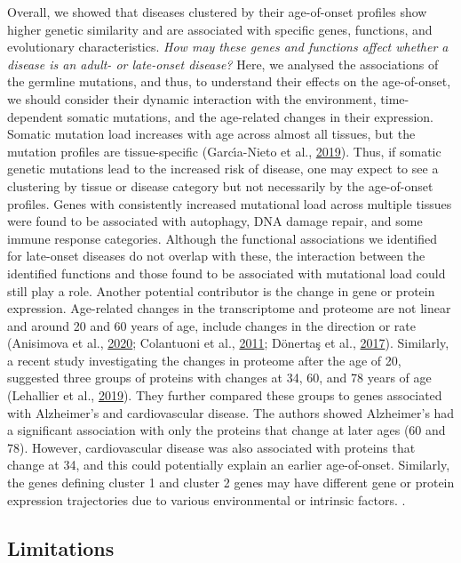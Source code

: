 \documentclass[12pt,twoside]{unicam}
\begin{document}
Overall, we showed that diseases clustered by their age-of-onset profiles show higher genetic similarity and are associated with specific genes, functions, and evolutionary characteristics. \emph{How may these genes and functions affect whether a disease is an adult- or late-onset disease?} Here, we analysed the associations of the germline mutations, and thus, to understand their effects on the age-of-onset, we should consider their dynamic interaction with the environment, time-dependent somatic mutations, and the age-related changes in their expression. Somatic mutation load increases with age across almost all tissues, but the mutation profiles are tissue-specific (Garcı́a-Nieto et al., \protect\hyperlink{ref-Garcia-Nieto2019}{2019}). Thus, if somatic genetic mutations lead to the increased risk of disease, one may expect to see a clustering by tissue or disease category but not necessarily by the age-of-onset profiles. Genes with consistently increased mutational load across multiple tissues were found to be associated with autophagy, DNA damage repair, and some immune response categories. Although the functional associations we identified for late-onset diseases do not overlap with these, the interaction between the identified functions and those found to be associated with mutational load could still play a role. Another potential contributor is the change in gene or protein expression. Age-related changes in the transcriptome and proteome are not linear and around 20 and 60 years of age, include changes in the direction or rate (Anisimova et al., \protect\hyperlink{ref-Anisimova2020}{2020}; Colantuoni et al., \protect\hyperlink{ref-Colantuoni2011}{2011}; Dönertaş et al., \protect\hyperlink{ref-Donertas2017}{2017}). Similarly, a recent study investigating the changes in proteome after the age of 20, suggested three groups of proteins with changes at 34, 60, and 78 years of age (Lehallier et al., \protect\hyperlink{ref-Lehallier2019}{2019}). They further compared these groups to genes associated with Alzheimer's and cardiovascular disease. The authors showed Alzheimer's had a significant association with only the proteins that change at later ages (60 and 78). However, cardiovascular disease was also associated with proteins that change at 34, and this could potentially explain an earlier age-of-onset. Similarly, the genes defining cluster 1 and cluster 2 genes may have different gene or protein expression trajectories due to various environmental or intrinsic factors. .

\hypertarget{limitations-1}{%
\subsection{Limitations}\label{limitations-1}}
\end{document}
